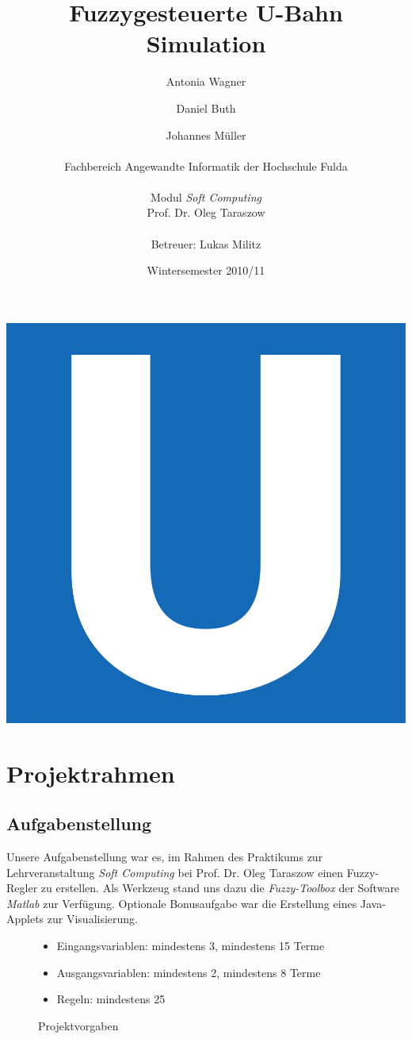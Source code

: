 \documentclass[10pt,a4paper]{article}
\author{Antonia Wagner \and Daniel Buth \and Johannes Müller \\ \\
Fachbereich Angewandte Informatik der Hochschule Fulda\\ \\
Modul \textit{Soft Computing}\\
Prof. Dr. Oleg Taraszow\\ \\
Betreuer: Lukas Militz
}
\title{Fuzzygesteuerte U-Bahn Simulation}
\date{Wintersemester 2010/11}
\begin{document}
\maketitle
\includegraphics[scale=.3]{ubahnlogo}

\newpage 

\tableofcontents
\begin{abstract}
\end{abstract}

\newpage 

\section{Projektrahmen}
\subsection{Aufgabenstellung}
Unsere Aufgabenstellung war es, im Rahmen des Praktikums zur Lehrveranstaltung \textit{Soft Computing} bei Prof. Dr. Oleg Taraszow einen Fuzzy-Regler zu erstellen.
Als Werkzeug stand uns dazu die \textit{Fuzzy-Toolbox} der Software \textit{Matlab} zur Verfügung.
Optionale Bonusaufgabe war die Erstellung eines Java-Applets zur Visualisierung.

\begin{figure}[htb]
\begin{itemize}
	\item Eingangsvariablen: mindestens 3, mindestens 15 Terme
	\item Ausgangsvariablen: mindestens 2, mindestens 8 Terme
	\item Regeln: mindestens 25
\end{itemize}
\caption{Projektvorgaben}
\label{projektvorgaben}
\end{figure}
\end{document}
